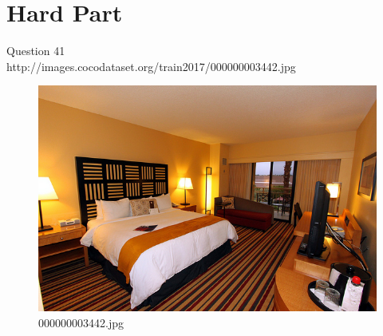 \section{Hard Part}
Question 41\\
http://images.cocodataset.org/train2017/000000003442.jpg
\begin{figure}[h]
    \centering
    \includegraphics[width=0.8\linewidth]{../image set/hard/000000003442.jpg}
    \caption{000000003442.jpg}
\end{figure}
